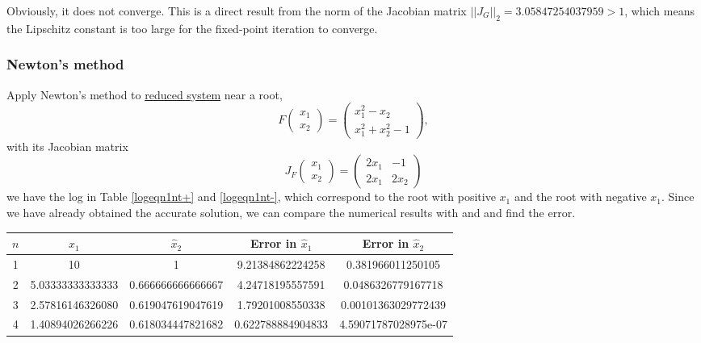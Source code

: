 \begin{table}[H]
\begin{table}[H]
Obviously, it does not converge.
This is a direct result from the norm of the Jacobian matrix \(||J_G||_2=3.05847254037959>1\), which means the Lipschitz constant is too large for the fixed-point iteration to converge.



\subsubsection{Newton's method}
Apply Newton's method to \hyperref[eqn1reduce]{reduced system} near a root,
\[ F\begin{pmatrix} x_1\\ x_2\end{pmatrix}=\begin{pmatrix} x_1^2-x_2 \\ x_1^2+x_2^2-1 \end{pmatrix}, \]
with its Jacobian matrix
\[ J_F\begin{pmatrix} x_1\\ x_2\end{pmatrix}=\begin{pmatrix} 2x_1 & -1 \\ 2x_1 & 2x_2 \end{pmatrix}\]
we have the log in Table \ref{logeqn1nt+} and \ref{logeqn1nt-}, which correspond to the root with positive \(x_1\) and the root with negative \(x_1\).
Since we have already obtained the accurate solution, we can compare the numerical results with and and find the error.
\ifnum{}
	\begin{table}[H]
\else
	\begin{table}[htbp]
\fi
	\centering
	\begin{subtable}[t]{\textwidth}
		\centering
		\begin{tabular}{|c|c|c|c|c|}
		\hline
		\(n\)	&	\(\hat{x}_1\)	&	\(\hat{x}_2\)	&	Error in \(\hat{x}_1\)	&	Error in \(\hat{x}_2\)		\\	\hline
		1	&	\footnotesize	10					&	\footnotesize	1					&	\footnotesize	9.21384862224258		&	\footnotesize	0.381966011250105		\\	\hline
		2	&	\footnotesize	5.03333333333333	&	\footnotesize	0.666666666666667	&	\footnotesize	4.24718195557591		&	\footnotesize	0.0486326779167718		\\	\hline
		3	&	\footnotesize	2.57816146326080	&	\footnotesize	0.619047619047619	&	\footnotesize	1.79201008550338		&	\footnotesize	0.00101363029772439		\\	\hline
		4	&	\footnotesize	1.40894026266226	&	\footnotesize	0.618034447821682	&	\footnotesize	0.622788884904833		&	\footnotesize	4.59071787028975e-07	\\	\hline

\end{tabular}
\end{subtable}
\end{table}
\end{table}
\end{table}
\end{table}
